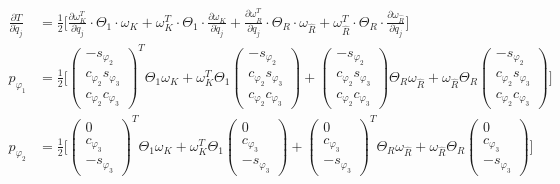 \begin{align}
\frac{\partial T}{\partial \dot{q}_j} &= \frac{1}{2} \bigg[ \frac{\partial \omega^T_K}{\partial \dot{q}_j} \cdot \Theta_1 \cdot \omega_K + \omega^T_K \cdot \Theta_1 \cdot \frac{\partial \omega_K}{\partial \dot{q}_j}  + \frac{\partial \omega_{\widehat{R}}^T}{\partial \dot{q}_j} \cdot \Theta_R \cdot \omega_{\widehat{R}} + \omega_{\widehat{R}}^T \cdot \Theta_R \cdot \frac{\partial \omega_{\widehat{R}}}{\partial \dot{q}_j} \bigg] 
\\
p_{\varphi_1} &= \frac{1}{2}\Bigg[
\begin{pmatrix}-s_{\varphi_2} \\ c_{\varphi_2}s_{\varphi_3} \\ c_{\varphi_2}c_{\varphi_3}
\end{pmatrix}^T  \Theta_1 \omega_K + \omega^T_K \Theta_1 \begin{pmatrix}-s_{\varphi_2} \\ c_{\varphi_2}s_{\varphi_3} \\ c_{\varphi_2}c_{\varphi_3}
\end{pmatrix} + \begin{pmatrix}-s_{\varphi_2} \\ c_{\varphi_2}s_{\varphi_3} \\ c_{\varphi_2}c_{\varphi_3}
\end{pmatrix} \Theta_R \omega_{\widehat{R}} + \omega_{\widehat{R}} \Theta_R  \begin{pmatrix}-s_{\varphi_2} \\ c_{\varphi_2}s_{\varphi_3} \\ c_{\varphi_2}c_{\varphi_3}
\end{pmatrix} \Bigg]
\\
p_{\varphi_2} &= \frac{1}{2} \Bigg[ \begin{pmatrix}0 \\ c_{\varphi_3} \\ -s_{\varphi_3}\end{pmatrix}^T \Theta_1 \omega_K + \omega^T_K \Theta_1 \begin{pmatrix}0 \\ c_{\varphi_3} \\ -s_{\varphi_3}\end{pmatrix} + \begin{pmatrix}0 \\ c_{\varphi_3} \\ -s_{\varphi_3}\end{pmatrix}^T \Theta_R \omega_{\widehat{R}} + \omega_{\widehat{R}} \Theta_R \begin{pmatrix}0 \\ c_{\varphi_3} \\ -s_{\varphi_3}\end{pmatrix} \Bigg]

\end{align}
